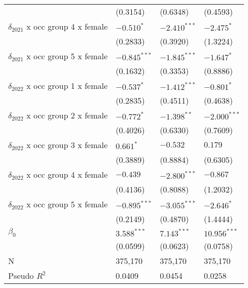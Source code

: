 \begin{tabular}{llll}
                                       &           (0.3154) &           (0.6348) &           (0.4593) \\
$\delta_{2021}$ x occ group 4 x female &         $-0.510^*$ &     $-2.410^{***}$ &         $-2.475^*$ \\
                                       &           (0.2833) &           (0.3920) &           (1.3224) \\
$\delta_{2021}$ x occ group 5 x female &     $-0.845^{***}$ &     $-1.845^{***}$ &         $-1.647^*$ \\
                                       &           (0.1632) &           (0.3353) &           (0.8886) \\
$\delta_{2022}$ x occ group 1 x female &         $-0.537^*$ &     $-1.412^{***}$ &         $-0.801^*$ \\
                                       &           (0.2835) &           (0.4511) &           (0.4638) \\
$\delta_{2022}$ x occ group 2 x female &         $-0.772^*$ &      $-1.398^{**}$ &     $-2.000^{***}$ \\
                                       &           (0.4026) &           (0.6330) &           (0.7609) \\
$\delta_{2022}$ x occ group 3 x female &          $0.661^*$ &           $-0.532$ &            $0.179$ \\
                                       &           (0.3889) &           (0.8884) &           (0.6305) \\
$\delta_{2022}$ x occ group 4 x female &           $-0.439$ &     $-2.800^{***}$ &           $-0.867$ \\
                                       &           (0.4136) &           (0.8088) &           (1.2032) \\
$\delta_{2022}$ x occ group 5 x female &     $-0.895^{***}$ &     $-3.055^{***}$ &         $-2.646^*$ \\
                                       &           (0.2149) &           (0.4870) &           (1.4444) \\
$\beta_0$                              &      $3.588^{***}$ &      $7.143^{***}$ &     $10.956^{***}$ \\
                                       &           (0.0599) &           (0.0623) &           (0.0758) \\
N                                      &            375,170 &            375,170 &            375,170 \\
Pseudo $R^2$                           &             0.0409 &             0.0454 &             0.0258 \\
\bottomrule
\end{tabular}
